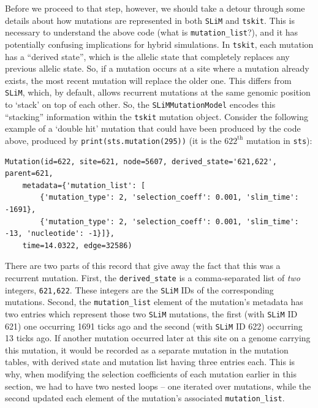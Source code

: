 \documentclass[12pt]{article}
\newcommand{\tskit}[0]{\texttt{tskit}\xspace}
\newcommand{\slim}[0]{\texttt{SLiM}\xspace}
\begin{document}
Before we proceed to that step, however, we should take a detour through
some details about how mutations are represented in both \slim and \tskit. 
This is necessary to understand the above code (what is \verb|mutation_list|?),
and it has potentially confusing implications for hybrid simulations. 
In \tskit, each mutation has a ``derived state'', which is the allelic state that completely replaces any previous allelic state.
So, if a mutation occurs at a site where a mutation already exists,
the most recent mutation will replace the older one.
This differs from \slim, which, by default, allows recurrent mutations at the same genomic
position to `stack' on top of each other.
So, the \verb|SLiMMutationModel| encodes this ``stacking'' information within the \tskit mutation object.
Consider the following example of a `double hit' mutation
that could have been produced by the code above, produced by \verb|print(sts.mutation(295))|
(it is the $622^\text{th}$ mutation in \verb|sts|):
\begin{verbatim}
Mutation(id=622, site=621, node=5607, derived_state='621,622', parent=621, 
    metadata={'mutation_list': [
        {'mutation_type': 2, 'selection_coeff': 0.001, 'slim_time': -1691},
        {'mutation_type': 2, 'selection_coeff': 0.001, 'slim_time': -13, 'nucleotide': -1}]},
    time=14.0322, edge=32586)
\end{verbatim}
There are two parts of this record that give away the fact that this was a recurrent mutation.
First, the \verb|derived_state| is a comma-separated list of \emph{two} integers, \verb|621,622|.
These integers are the \slim IDs of the corresponding mutations.
Second, the \verb|mutation_list| element of the mutation's metadata has two entries which represent those two \slim mutations,
the first (with \slim ID 621) one occurring 1691 ticks ago and the second (with \slim ID 622)  occurring 13 ticks ago.
If another mutation occurred later at this site on a genome carrying this mutation,
it would be recorded as a separate mutation in the mutation tables,
with derived state and mutation list having three entries each.
This is why, when modifying
the selection coefficients of each mutation earlier in this section, we had to have two nested loops --
one iterated over mutations,
while the second updated each element of the mutation's associated \verb|mutation_list|.
\end{document}

